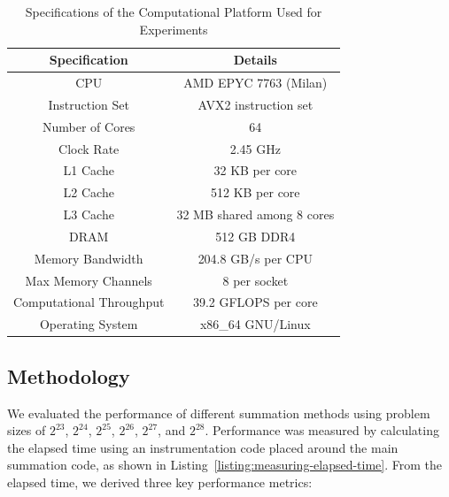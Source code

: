 \begin{table}[htbp]
    \centering\small
    \begin{tabular}{c|c}
        \textbf{Specification} & \textbf{Details} \\
        \hline
        CPU & AMD EPYC 7763 (Milan) \cite{nersc_perlmutter_architecture} \\
        Instruction Set & AVX2 instruction set  \cite{nersc_perlmutter_architecture} \\
        Number of Cores & 64 \cite{nersc_perlmutter_architecture} \\
        Clock Rate & 2.45 GHz \cite{nersc_perlmutter_architecture} \\
        L1 Cache & 32 KB per core \cite{amd_epyc_tuning_guide} \\
        L2 Cache & 512 KB per core \cite{amd_epyc_tuning_guide} \\
        L3 Cache & 32 MB shared among 8 cores  \cite{amd_epyc_tuning_guide} \\
        DRAM & 512 GB DDR4 \cite{nersc_perlmutter_architecture} \\
        Memory Bandwidth & 204.8 GB/s per CPU \cite{nersc_perlmutter_architecture} \\
        Max Memory Channels & 8 per socket \cite{amd_epyc_tuning_guide} \\
        Computational Throughput & 39.2 GFLOPS per core \cite{nersc_perlmutter_architecture} \\
        Operating System & x86\_64 GNU/Linux \\
    \end{tabular}
    \caption{Specifications of the Computational Platform Used for Experiments}
    \label{tab:machine_detail}
\end{table}

\FloatBarrier
\subsection{Methodology}
\label{sec:methodology}

We evaluated the performance of different summation methods using problem sizes of \(2^{23}\), \(2^{24}\), \(2^{25}\), \(2^{26}\), \(2^{27}\), and \(2^{28}\). Performance was measured by calculating the elapsed time using an instrumentation code placed around the main summation code, as shown in Listing~\ref{listing:measuring-elapsed-time}. From the elapsed time, we derived three key performance metrics:

